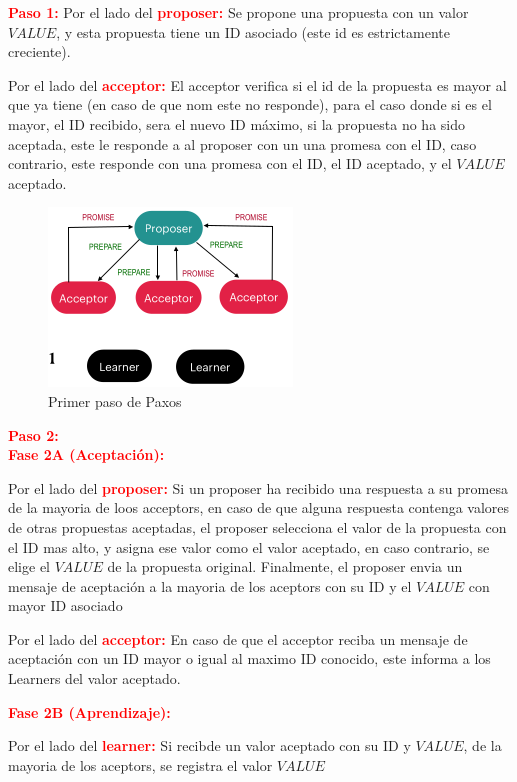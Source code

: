 \textcolor{red}{\textbf{Paso 1:}}
Por el lado del \textcolor{red}{\textbf{proposer:}} Se propone una propuesta con un valor $VALUE$, y esta propuesta tiene un ID asociado (este id es estrictamente creciente).

Por el lado del \textcolor{red}{\textbf{acceptor:}} El acceptor verifica si el id de la propuesta es mayor al que ya tiene (en caso de que nom este no responde), para el caso donde si es el mayor, el ID recibido, sera el nuevo ID máximo, si la propuesta no ha sido aceptada, este le responde a al proposer con un una promesa con el ID, caso contrario, este responde con una promesa con el ID, el ID aceptado, y el $VALUE$ aceptado.
\begin{figure}[H]
    \centering
    \includegraphics[width=0.4\linewidth]{img/Paso_1_paxos.png}
    \caption{Primer paso de Paxos}\label{fig:1761859086537}
\end{figure}

\textcolor{red}{\textbf{Paso 2:}}\\
\textcolor{red}{\textbf{Fase 2A (Aceptación):}}

    Por el lado del \textcolor{red}{\textbf{proposer:}} Si un proposer ha recibido una respuesta a su promesa de la mayoria de loos acceptors, en caso de que alguna respuesta contenga valores de otras propuestas aceptadas, el proposer selecciona el valor de la propuesta con el ID mas alto, y asigna ese valor como el valor aceptado, en caso contrario, se elige el $VALUE$ de la propuesta original. Finalmente, el proposer envia un mensaje de aceptación a la mayoria de los aceptors con su ID y el $VALUE$ con mayor ID asociado
    
    Por el lado del \textcolor{red}{\textbf{acceptor:}} En caso de que el acceptor reciba un mensaje de aceptación con un ID mayor o igual al maximo ID conocido, este informa a los Learners del valor aceptado.


\textcolor{red}{\textbf{Fase 2B (Aprendizaje):}}

Por el lado del \textcolor{red}{\textbf{learner:}} Si recibde un valor aceptado con su ID y $VALUE$, de la mayoria de los aceptors, se registra el valor $VALUE$ 

